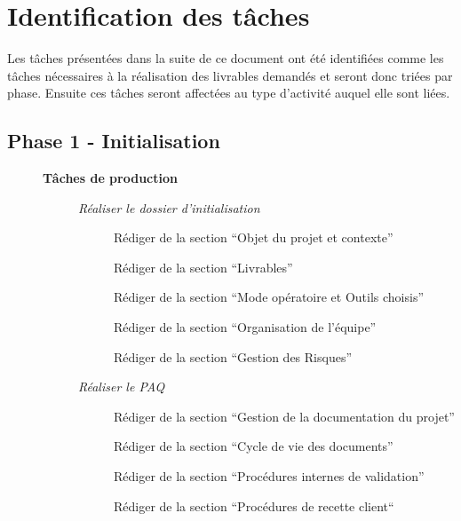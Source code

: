 \section{Identification des tâches}

Les tâches présentées dans la suite de ce document ont été identifiées comme les tâches nécessaires à la réalisation des livrables demandés et seront donc triées par phase. Ensuite ces tâches seront affectées au type d’activité auquel elle sont liées.  

\subsection{Phase 1 - Initialisation}

\begin{description}
    \item[] \bf{Tâches de production}
        \begin{description}
            \item[\textbullet] \it{Réaliser le dossier d’initialisation}
                \begin{description}
                    \item[\textbullet] Rédiger de la section “Objet du projet et contexte”
                    \item[\textbullet] Rédiger de la section “Livrables”
                    \item[\textbullet] Rédiger de la section “Mode opératoire et Outils choisis”
                    \item[\textbullet] Rédiger de la section “Organisation de l’équipe”
                    \item[\textbullet] Rédiger de la section “Gestion des Risques”
                \end{description}
            \item[\textbullet] \it{Réaliser le PAQ}
                \begin{description}
                    \item[\textbullet] Rédiger de la section “Gestion de la documentation du projet”
                    \item[\textbullet] Rédiger de la section “Cycle de vie des documents”
                    \item[\textbullet] Rédiger de la section “Procédures internes de validation”
                    \item[\textbullet] Rédiger de la section “Procédures de recette client“

\end{description}
\end{description}
\end{description}
